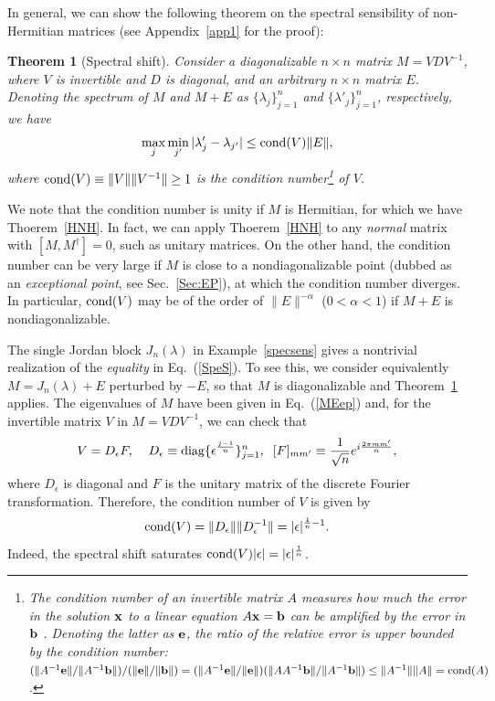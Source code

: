 \documentclass{tADP2e}
\theoremstyle{plain}
\theoremstyle{plain}
\newtheorem{theorem}{Theorem}[section]
\theoremstyle{definition}
\begin{document}
In general, we can show the following theorem on the spectral sensibility of non-Hermitian matrices \cite{RB97} (see Appendix~\ref{app1} for the proof):
\begin{theorem}[Spectral shift]
\label{NHSS}
Consider a diagonalizable $n\times n$ matrix $M=VDV^{-1}$, where $V$ is invertible and $D$ is diagonal, and an arbitrary $n\times n$ matrix $E$. Denoting the spectrum of $M$ and $M+E$ as $\{\lambda_j\}^n_{j=1}$ and $\{\lambda'_j\}^n_{j=1}$, respectively, we have
\begin{equation}
\max_j\min_{j'}|\lambda'_j-\lambda_{j'}|\le{\rm cond}(V)\|E\|,
\label{SpeS}
\end{equation}
where ${\rm cond}(V)\equiv \|V\|\|V^{-1}\|\ge1$ is the condition number\footnote{The condition number of an invertible matrix $A$ measures how much the error in the solution $\bold{x}$ to a linear equation $A\bold{x}=\bold{b}$ can be amplified by the error in $\bold{b}$ \cite{CDM00}. Denoting the latter as $\bold{e}$, the ratio of the relative error is upper bounded by the condition number: $(\|A^{-1}\bold{e}\|/\|A^{-1}\bold{b}\|)/(\|\bold{e}\|/\|\bold{b}\|)=(\|A^{-1}\bold{e}\|/\|\bold{e}\|)(\|AA^{-1}\bold{b}\|/\|A^{-1}\bold{b}\|)\le \|A^{-1}\|\|A\|={\rm cond}(A)$.} of $V$. 
\end{theorem}

We note that the condition number is unity if $M$ is Hermitian, for which we have Thoerem~\ref{HNH}. In fact, we can apply Thoerem~\ref{HNH} to any \emph{normal} matrix with $[M,M^\dag]=0$, such as unitary matrices. On the other hand, the condition number can be very large if $M$ is close to a nondiagonalizable point (dubbed as an \emph{exceptional point}, see Sec.~\ref{Sec:EP}), at which the condition number diverges. In particular, ${\rm cond}(V)$ may be of the order of $\|E\|^{-\alpha}$ ($0<\alpha<1$) if $M+E$ is nondiagonalizable. 

The single Jordan block $J_n(\lambda)$ in Example~\ref{specsens} gives a nontrivial realization of the \emph{equality} in Eq.~(\ref{SpeS}). To see this, we consider equivalently $M=J_n(\lambda)+E$ perturbed by $-E$, so that $M$ is diagonalizable and Theorem~\ref{NHSS} applies. The eigenvalues of $M$ have been given in Eq.~(\ref{MEep}) and, for the invertible matrix $V$ in $M=VDV^{-1}$, we can check that
\begin{equation}
V=D_\epsilon F,\;\;\;\;
D_\epsilon\equiv{\rm diag}\{\epsilon^{\frac{j-1}{n}}\}^n_{j=1},\;\;
[F]_{mm'}\equiv\frac{1}{\sqrt{n}}e^{i\frac{2\pi mm'}{n}},
\end{equation}
where $D_\epsilon$ is diagonal and $F$ is the unitary matrix of the discrete Fourier transformation. Therefore, the condition number of $V$ is given by
\begin{equation}
{\rm cond}(V)=\|D_\epsilon\|\|D_\epsilon^{-1}\|=|\epsilon|^{\frac{1}{n}-1}.
\end{equation}
Indeed, the spectral shift saturates ${\rm cond}(V)|\epsilon|=|\epsilon|^{\frac{1}{n}}$.
\end{document}
